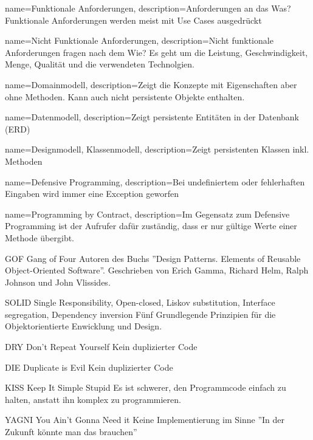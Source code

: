 {
	name={Funktionale Anforderungen},
	description={Anforderungen an das Was? Funktionale Anforderungen werden meist mit Use Cases ausgedrückt}
}

{
	name={Nicht Funktionale Anforderungen},
	description={Nicht funktionale Anforderungen fragen nach dem Wie? Es geht um die Leistung, Geschwindigkeit, Menge, Qualität und die verwendeten Technolgien.}
}

{
	name={Domainmodell},
	description={Zeigt die Konzepte mit Eigenschaften aber ohne Methoden. Kann auch nicht persistente Objekte enthalten.}
}

{
	name={Datenmodell},
	description={Zeigt persistente Entitäten in der Datenbank (ERD)}
}

{
	name={Designmodell, Klassenmodell},
	description={Zeigt persistenten Klassen inkl. Methoden}
}

{
	name={Defensive Programming},
	description={Bei undefiniertem oder fehlerhaften Eingaben wird immer eine Exception geworfen}
}

{
	name={Programming by Contract},
	description={Im Gegensatz zum Defensive Programming ist der Aufrufer dafür zuständig, dass er nur gültige Werte einer Methode übergibt.}
}

{GOF}
{Gang of Four}
{
	Autoren des Buchs ''Design Patterns. Elements of Reusable Object-Oriented Software''. Geschrieben von Erich Gamma, Richard Helm, Ralph Johnson und John Vlissides. 
}

{SOLID}
{Single Responsibility, Open-closed, Liskov substitution, Interface segregation, Dependency inversion}
{
	Fünf Grundlegende Prinzipien für die Objektorientierte Enwicklung und Design.
}

{DRY}
{Don't Repeat Yourself}
{
	Kein duplizierter Code
}

{DIE}
{Duplicate is Evil}
{
	Kein duplizierter Code
}

{KISS}
{Keep It Simple Stupid}
{
	Es ist schwerer, den Programmcode einfach zu halten, anstatt ihn komplex zu programmieren.
}

{YAGNI}
{You Ain't Gonna Need it}
{
	Keine Implementierung im Sinne ''In der Zukunft könnte man das brauchen''
}

